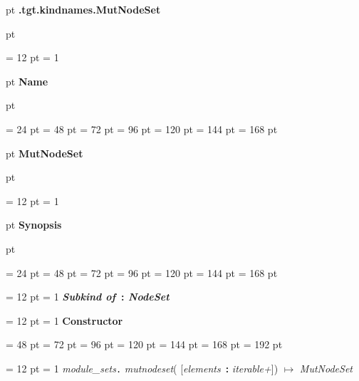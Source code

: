 {\par \pagebreak[3]  pt \noindent
{\LARGE {\bf .tgt.kindnames.MutNodeSet\/}}\par {} pt
} \noindent
{\par \noindent
{\par \pagebreak[3.300000] \noindent \hangindent = 12 pt \hangafter = 1 
{\par \pagebreak[3]  pt \noindent
{\Large {\bf Name\/}}\par {} pt
} \noindent
\par}
{\par \noindent  \leftskip = 24 pt  \leftmargini = 48 pt  \leftmarginii = 72 pt  \leftmarginiii = 96 pt  \leftmarginiv = 120 pt  \leftmarginv = 144 pt  \leftmarginvi = 168 pt {\par \pagebreak[3]  pt \noindent
{\Large {\bf MutNodeSet\/}}\par {} pt
} \noindent
\par}
{\par \pagebreak[3.300000] \noindent \hangindent = 12 pt \hangafter = 1 
{\par \pagebreak[3]  pt \noindent
{\Large {\bf Synopsis\/}}\par {} pt
} \noindent
\par}
{\par \noindent  \leftskip = 24 pt  \leftmargini = 48 pt  \leftmarginii = 72 pt  \leftmarginiii = 96 pt  \leftmarginiv = 120 pt  \leftmarginv = 144 pt  \leftmarginvi = 168 pt {\par \noindent
{\par \pagebreak[3.200000] \noindent \hangindent = 12 pt \hangafter = 1 
{\bf {\large {\bf  {\em Subkind of\/}~{\bf :}  {\em NodeSet\/}\/}}\/}\par}
{\par \pagebreak[3.200000] \noindent \hangindent = 12 pt \hangafter = 1 
{\large {\bf Constructor\/}}\par}
{\par \noindent  \leftskip = 48 pt  \leftmargini = 72 pt  \leftmarginii = 96 pt  \leftmarginiii = 120 pt  \leftmarginiv = 144 pt  \leftmarginv = 168 pt  \leftmarginvi = 192 pt {\par \noindent
{\par \pagebreak[3.100000] \noindent \hangindent = 12 pt \hangafter = 1 
 {\em module{\_}sets\/}{\large {\tt .\/} {\em mutnodeset\/}}( {[}{\em elements\/}~{\bf :}  {\em iterable+\/}]) \(\mapsto \)  {\em MutNodeSet\/}\par}
}}}}}
